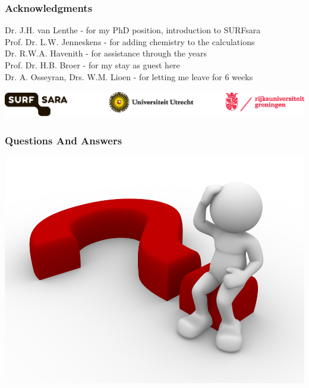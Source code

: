 \documentclass[]{beamer}
\begin{document}
\begin{frame}
  \frametitle{Acknowledgments}
  \begin{small}
  {Dr. J.H. van Lenthe - for my PhD position, introduction to SURFsara} \\
  {Prof. Dr. L.W. Jenneskens - for adding chemistry to the calculations} \\
  \vspace{15px}
  {Dr. R.W.A. Havenith - for assistance through the years} \\
  {Prof. Dr. H.B. Broer - for my stay as guest here} \\
  \vspace{15px}
  {Dr. A. Osseyran, Drs. W.M. Lioen - for letting me leave for 6 weeks} \\
  \end{small}
  \vspace{20px}\includegraphics[scale=0.38]{figures/logos.eps}
\end{frame}

\begin{frame}
  \frametitle{Questions And Answers}
  \begin{center}
    \includegraphics[scale=0.85]{figures/questions_answers_5.jpg}  
  \end{center}
\end{frame}
\end{document}
